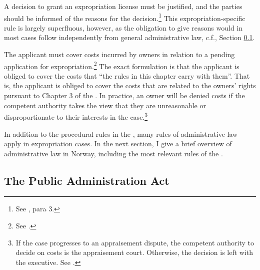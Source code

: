 A decision to grant an expropriation license must be justified, and the parties should be informed of the reasons for the decision.\footnote{See \cite[12]{ea59}, para 3.} This expropriation-specific rule is largely superfluous, however, as the obligation to give reasons would in most cases follow independently from general administrative law, c.f., Section \ref{sec:paa67}.

The applicant must cover costs incurred by owners in relation to a pending application for expropriation.\footnote{See \cite[15]{ea59}.} The exact formulation is that the applicant is obliged to cover the costs that ``the rules in this chapter carry with them''. That is, the applicant is obliged to cover the costs that are related to the owners' rights pursuant to Chapter 3 of the \cite{ea59}. In practice, an owner will be denied costs if the competent authority takes the view that they are unreasonable or disproportionate to their interests in the case.\footnote{If the case progresses to an appraisement dispute, the competent authority to decide on costs is the appraisement court. Otherwise, the decision is left with the executive. See \cite[15]{ea59}.}


In addition to the procedural rules in the \cite{ea59}, many rules of administrative law apply in expropriation cases. In the next section, I give a brief overview of administrative law in Norway, including the most relevant rules of the \cite{paa67}.

\subsection{The Public Administration Act}\label{sec:paa67}

